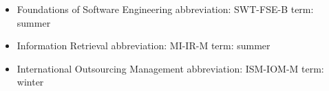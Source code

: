 
\begin{itemize}
	\item Foundations of Software Engineering
	\subitem abbreviation: SWT-FSE-B
	\subitem term: summer
	\item Information Retrieval
	\subitem abbreviation: MI-IR-M
	\subitem term: summer 
	\item International Outsourcing Management
	\subitem abbreviation: ISM-IOM-M
	\subitem term: winter 
\end{itemize}
